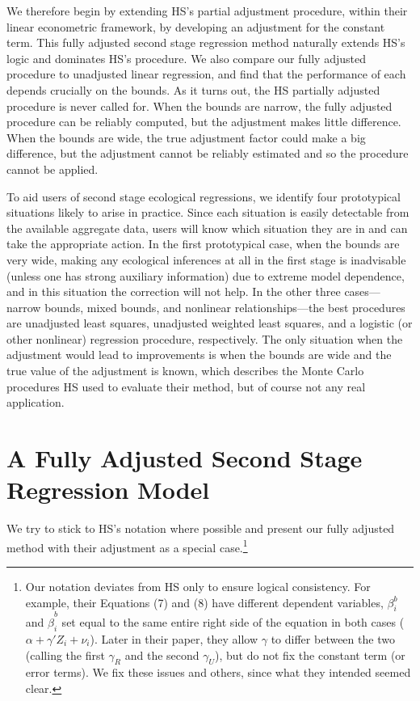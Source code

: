 \documentclass[11pt,titlepage]{article}
\begin{document}
We therefore begin by extending HS's partial adjustment procedure,
within their linear econometric framework, by developing an adjustment
for the constant term.  This fully adjusted second stage regression
method naturally extends HS's logic and dominates HS's procedure.  We
also compare our fully adjusted procedure to unadjusted linear
regression, and find that the performance of each depends crucially on
the bounds.  As it turns out, the HS partially adjusted procedure is
never called for.  When the bounds are narrow, the fully adjusted
procedure can be reliably computed, but the adjustment makes little
difference.  When the bounds are wide, the true adjustment factor
could make a big difference, but the adjustment cannot be reliably
estimated and so the procedure cannot be applied.

To aid users of second stage ecological regressions, we identify four
prototypical situations likely to arise in practice.  Since each
situation is easily detectable from the available aggregate data,
users will know which situation they are in and can take the
appropriate action.  In the first prototypical case, when the bounds
are very wide, making any ecological inferences at all in the first
stage is inadvisable (unless one has strong auxiliary information) due
to extreme model dependence, and in this situation the correction will
not help.  In the other three cases---narrow bounds, mixed bounds, and
nonlinear relationships---the best procedures are unadjusted least
squares, unadjusted weighted least squares, and a logistic (or other
nonlinear) regression procedure, respectively.  The only situation
when the adjustment would lead to improvements is when the bounds are
wide and the true value of the adjustment is known, which describes
the Monte Carlo procedures HS used to evaluate their method, but of
course not any real application.

\section{A Fully Adjusted Second Stage Regression Model}
\label{s:fulladj}

We try to stick to HS's notation where possible and present our fully
adjusted method with their adjustment as a special case.\footnote{Our
  notation deviates from HS only to ensure logical consistency.  For
  example, their Equations (7) and (8) have different dependent
  variables, $\beta_i^b$ and $\hat\beta_i^b$ set equal to the same
  entire right side of the equation in both cases
  ($\alpha+\gamma'Z_i+\nu_i$).  Later in their paper, they allow
  $\gamma$ to differ between the two (calling the first $\gamma_R$ and
  the second $\gamma_U$), but do not fix the constant term (or error
  terms).  We fix these issues and others, since what they intended
  seemed clear.}
\end{document}
